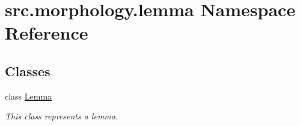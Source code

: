 \hypertarget{namespacesrc_1_1morphology_1_1lemma}{\section{src.\+morphology.\+lemma Namespace Reference}
\label{namespacesrc_1_1morphology_1_1lemma}
}
\subsection*{Classes}
\begin{DoxyCompactItemize}
\item 
class \hyperlink{classsrc_1_1morphology_1_1lemma_1_1_lemma}{Lemma}
\begin{DoxyCompactList}\small\item\em This class represents a lemma. \end{DoxyCompactList}\end{DoxyCompactItemize}
